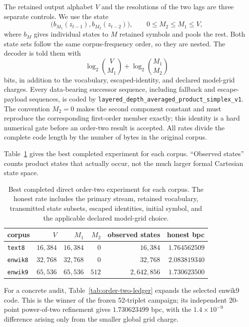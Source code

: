 The retained output alphabet $V$ and the resolutions of the two lags are
three separate controls.  We use the state
\[
 \bigl(b_{M_1}(z_{t-1}),b_{M_2}(z_{t-2})\bigr),
 \qquad 0\leq M_2\leq M_1\leq V,
\]
where $b_M$ gives individual states to $M$ retained symbols and pools the
rest.  Both state sets follow the same corpus-frequency order, so they are
nested.  The decoder is told them with
\[
 \log_2\binom{V}{M_1}+\log_2\binom{M_1}{M_2}
\]
bits, in addition to the vocabulary, escaped-identity, and declared
model-grid charges.  Every data-bearing successor sequence, including
fallback and escape-payload sequences, is coded by
\texttt{layered\_depth\_averaged\_product\_simplex\_v1}.  The convention
$M_2=0$ makes the second component constant and must reproduce the
corresponding first-order member exactly; this identity is a hard numerical
gate before an order-two result is accepted.  All rates divide the complete
code length by the number of bytes in the original corpus.

Table~\ref{tab:order-two-best} gives the best completed experiment for each
corpus.  ``Observed states'' counts product states that actually occur, not
the much larger formal Cartesian state space.

\begin{table}[ht]
\centering
\begin{tabular}{lrrrrr}
\toprule
corpus & $V$ & $M_1$ & $M_2$ & observed states & honest bpc \\
\midrule
\texttt{text8}  & $16{,}384$ & $16{,}384$ & $0$   & $16{,}384$   & $1.764562509$ \\
\texttt{enwik8} & $32{,}768$ & $32{,}768$ & $0$   & $32{,}768$   & $2.083819340$ \\
\texttt{enwik9} & $65{,}536$ & $65{,}536$ & $512$ & $2{,}642{,}856$ & $\mathbf{1.730623500}$ \\
\bottomrule
\end{tabular}
\caption{Best completed direct order-two experiment for each corpus.  The
  honest rate includes the primary stream, retained vocabulary, transmitted
  state subsets, escaped identities, initial symbol, and the applicable
  declared model-grid choice.}
\label{tab:order-two-best}
\end{table}

For a concrete audit, Table~\ref{tab:order-two-ledger} expands the selected
enwik9 code.  This is the winner of the frozen 52-triplet campaign; its
independent 20-point power-of-two refinement gives $1.730623499$ bpc, with
the $1.4\mathbin{\times}10^{-9}$ difference arising only from the smaller
global grid charge.

